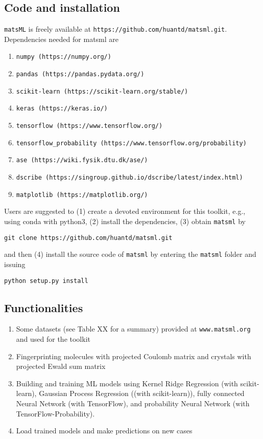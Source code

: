 \documentclass[12pt]{article}
\begin{document}
\subsection{Code and installation}
\texttt{matsML} is freely available at \texttt{https://github.com/huantd/matsml.git}. Dependencies needed for {\sc matsml} are
\begin{enumerate}
  \setlength\itemsep{-0.3em}
        \item \texttt{numpy (https://numpy.org/)}
	\item \texttt{pandas (https://pandas.pydata.org/)}
	\item \texttt{scikit-learn (https://scikit-learn.org/stable/)}
	\item \texttt{keras (https://keras.io/)} 
	\item \texttt{tensorflow (https://www.tensorflow.org/)}
	\item \texttt{tensorflow\_probability (https://www.tensorflow.org/probability)}
	\item \texttt{ase (https://wiki.fysik.dtu.dk/ase/)}
	\item \texttt{dscribe (https://singroup.github.io/dscribe/latest/index.html)} 
	\item \texttt{matplotlib (https://matplotlib.org/)}
\end{enumerate}
Users are suggested to (1) create a devoted environment for this toolkit, e.g., using conda with python3, (2) install the dependencies, (3) obtain \texttt{matsml} by
\begin{tcolorbox}
\begin{verbatim}
git clone https://github.com/huantd/matsml.git
\end{verbatim}
\end{tcolorbox}
and then (4) install the source code of \texttt{matsml} by entering the \texttt{matsml} folder and issuing
\begin{tcolorbox}
\begin{verbatim}
python setup.py install
\end{verbatim}
\end{tcolorbox}

\subsection{Functionalities}
\begin{enumerate}
  \setlength\itemsep{-0.3em}
      \item Some datasets (see Table XX for a summary) provided at \texttt{www.matsml.org} and used for the toolkit
      \item Fingerprinting molecules with projected Coulomb matrix and crystals with projected Ewald sum matrix 
      \item Building and training ML models using Kernel Ridge Regression (with scikit-learn), Gaussian Process Regression ((with scikit-learn)), fully connected Neural Network (with TensorFlow), and probability Neural Network (with TensorFlow-Probability).
      \item Load trained models and make predictions on new cases
\end{enumerate}
\end{document}
